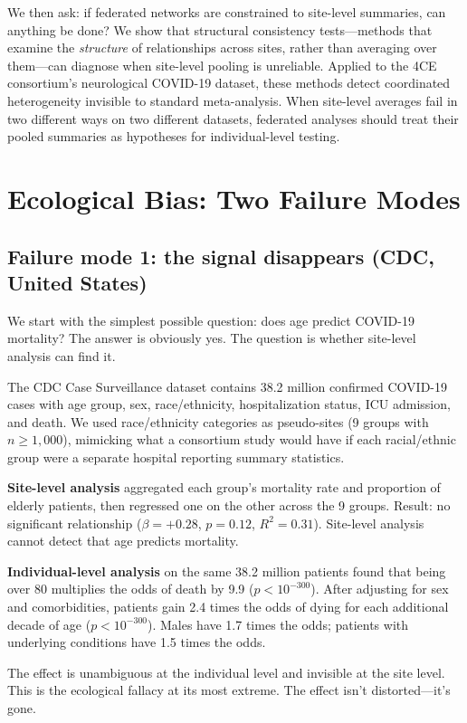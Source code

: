 \documentclass{article}
\begin{document}
We then ask: if federated networks are constrained to site-level summaries,
can anything be done?  We show that structural consistency tests---methods
that examine the \emph{structure} of relationships across sites, rather than
averaging over them---can diagnose when site-level pooling is unreliable.
Applied to the 4CE consortium's neurological COVID-19 dataset, these methods
detect coordinated heterogeneity invisible to standard meta-analysis.  When
site-level averages fail in two different ways on two different datasets,
federated analyses should treat their pooled summaries as hypotheses for
individual-level testing.


\section{Ecological Bias: Two Failure Modes}

\subsection{Failure mode 1: the signal disappears (CDC, United States)}

We start with the simplest possible question: does age predict COVID-19
mortality?  The answer is obviously yes.  The question is whether site-level
analysis can find it.

The CDC Case Surveillance dataset contains 38.2 million confirmed COVID-19
cases with age group, sex, race/ethnicity, hospitalization status, ICU
admission, and death.  We used race/ethnicity categories as pseudo-sites (9
groups with $n \geq 1{,}000$), mimicking what a consortium study would have
if each racial/ethnic group were a separate hospital reporting summary
statistics.

\textbf{Site-level analysis} aggregated each group's mortality rate and
proportion of elderly patients, then regressed one on the other across the 9
groups.  Result: no significant relationship ($\beta = +0.28$, $p = 0.12$,
$R^2 = 0.31$).  Site-level analysis cannot detect that age predicts mortality.

\textbf{Individual-level analysis} on the same 38.2 million patients found
that being over 80 multiplies the odds of death by 9.9 ($p < 10^{-300}$).
After adjusting for sex and comorbidities, patients gain 2.4 times the odds of
dying for each additional decade of age ($p < 10^{-300}$).  Males have 1.7
times the odds; patients with underlying conditions have 1.5 times the odds.

The effect is unambiguous at the individual level and invisible at the site
level.  This is the ecological fallacy at its most extreme.  The effect
isn't distorted---it's gone.
\end{document}
